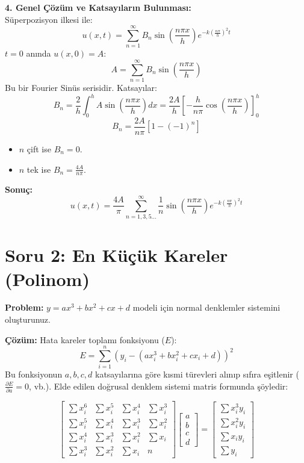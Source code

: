 \documentclass[12pt, a4paper]{article}
\begin{document}
\textbf{4. Genel Çözüm ve Katsayıların Bulunması:} \\
Süperpozisyon ilkesi ile:
\[ u(x,t) = \sum_{n=1}^{\infty} B_n \sin\left(\frac{n\pi x}{h}\right) e^{-k \left(\frac{n\pi}{h}\right)^2 t} \]
$t=0$ anında $u(x,0) = A$:
\[ A = \sum_{n=1}^{\infty} B_n \sin\left(\frac{n\pi x}{h}\right) \]
Bu bir Fourier Sinüs serisidir. Katsayılar:
\[ B_n = \frac{2}{h} \int_{0}^{h} A \sin\left(\frac{n\pi x}{h}\right) dx = \frac{2A}{h} \left[ -\frac{h}{n\pi} \cos\left(\frac{n\pi x}{h}\right) \right]_0^h \]
\[ B_n = \frac{2A}{n\pi} [1 - (-1)^n] \]
\begin{itemize}
    \item $n$ çift ise $B_n = 0$.
    \item $n$ tek ise $B_n = \frac{4A}{n\pi}$.
\end{itemize}

\textbf{Sonuç:}
\begin{equation*}
    \boxed{u(x,t) = \frac{4A}{\pi} \sum_{n=1,3,5...}^{\infty} \frac{1}{n} \sin\left(\frac{n\pi x}{h}\right) e^{-k\left(\frac{n\pi}{h}\right)^2 t}}
\end{equation*}

\newpage

\section*{Soru 2: En Küçük Kareler (Polinom)}
\textbf{Problem:} $y = ax^3 + bx^2 + cx + d$ modeli için normal denklemler sistemini oluşturunuz.

\textbf{Çözüm:}
Hata kareler toplamı fonksiyonu ($E$):
\[ E = \sum_{i=1}^{n} \left( y_i - (ax_i^3 + bx_i^2 + cx_i + d) \right)^2 \]
Bu fonksiyonun $a,b,c,d$ katsayılarına göre kısmi türevleri alınıp sıfıra eşitlenir ($\frac{\partial E}{\partial a}=0$, vb.). Elde edilen doğrusal denklem sistemi matris formunda şöyledir:

\begin{equation*}
\begin{bmatrix}
\sum x_i^6 & \sum x_i^5 & \sum x_i^4 & \sum x_i^3 \\
\sum x_i^5 & \sum x_i^4 & \sum x_i^3 & \sum x_i^2 \\
\sum x_i^4 & \sum x_i^3 & \sum x_i^2 & \sum x_i \\
\sum x_i^3 & \sum x_i^2 & \sum x_i & n
\end{bmatrix}
\begin{bmatrix}
a \\ b \\ c \\ d
\end{bmatrix}
=
\begin{bmatrix}
\sum x_i^3 y_i \\
\sum x_i^2 y_i \\
\sum x_i y_i \\
\sum y_i
\end{bmatrix}
\end{equation*}
\end{document}
